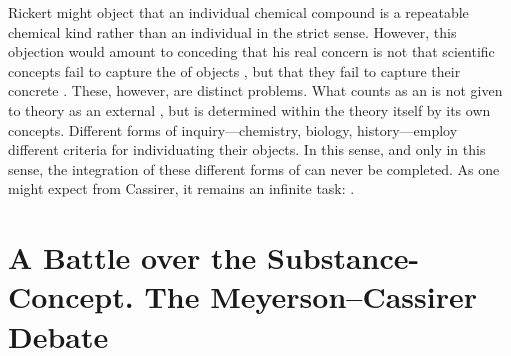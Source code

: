 \documentclass[submitted,12pt]{article}
\renewcommand{\SF}[2]{\citep[#1/#2]{Cassirer1910}}
\begin{document}
Rickert might object that an individual chemical compound is a repeatable chemical kind rather than an individual in the strict sense. However, this objection would amount to conceding that his real concern is not that scientific concepts fail to capture the  of objects , but that they fail to capture their concrete   \SF{305}{229}. These, however, are distinct problems. What counts as an  is not given to theory as an external , but is determined within the theory itself by its own  concepts. Different forms of inquiry---chemistry, biology, history---employ different criteria for individuating their objects. In this sense, and only in this sense, the integration of these different forms of  can never be completed. As one might expect from Cassirer, it remains an infinite task:  \SF{309}{232}.

 
\section{A  Battle over the Substance-Concept. The Meyerson--Cassirer Debate}
\label{sec:meyerson}
\end{document}
